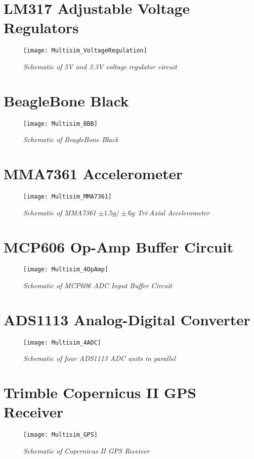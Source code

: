 \section{LM317 Adjustable Voltage Regulators}
\begin{figure}[H]
\centering
\texttt{[image: Multisim\_VoltageRegulation]}
\caption{\textit{Schematic of 5V and 3.3V voltage regulator circuit}}
\label{fig:Schematic_VoltageReg}
\end{figure}

\section{BeagleBone Black}
\begin{figure}[H]
\centering
\texttt{[image: Multisim\_BBB]}
\caption{\textit{Schematic of BeagleBone Black}}
\label{fig:Schematic_BBB}
\end{figure}

\section{MMA7361 Accelerometer}
\begin{figure}[H]
\centering
\texttt{[image: Multisim\_MMA7361]}
\caption{\textit{Schematic of MMA7361 $\pm 1.5g/ \pm 6g$ Tri-Axial Accelerometer}}
\label{fig:Schematic_MMA7361}
\end{figure}

\section{MCP606 Op-Amp Buffer Circuit}
\begin{figure}[H]
\centering
\texttt{[image: Multisim\_4OpAmp]}
\caption{\textit{Schematic of MCP606 ADC Input Buffer Circuit}}
\label{fig:Schematic_MCP606}
\end{figure}

\section{ADS1113 Analog-Digital Converter}
\begin{figure}[H]
\centering
\texttt{[image: Multisim\_4ADC]}
\caption{\textit{Schematic of four ADS1113 ADC units in parallel}}
\label{fig:Schematic_ADS1113}
\end{figure}

\section{Trimble Copernicus II GPS Receiver}
\begin{figure}[H]
\centering
\texttt{[image: Multisim\_GPS]}
\caption{\textit{Schematic of Copernicus II GPS Receiver}}
\label{fig:Schematic_Copernicus}
\end{figure}